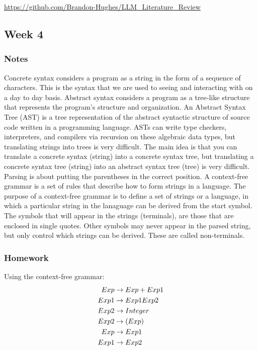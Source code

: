 \documentclass{article}
\theoremstyle{theorem}
\theoremstyle{definition}
\theoremstyle{remark}
\begin{document}
\url{https://github.com/Brandon-Hughes/LLM_Literature_Review}



\subsection{Week 4}

\subsubsection{Notes}

Concrete syntax considers a program as a string in the form of a sequence of characters. This is the syntax that we are used to seeing and interacting with on a day to day basis. 
Abstract syntax considers a program as a tree-like structure that represents the program's structure and organization. 
An Abstract Syntax Tree (AST) is a tree representation of the abstract syntactic structure of source code written in a programming language. 
ASTs can write type checkers, interpreters, and compilers via recursion on these algebraic data types, but translating strings into trees is very difficult.
The main idea is that you can translate a concrete syntax (string) into a concrete syntax tree, but translating a concrete syntax tree (string) into an abstract syntax tree (tree) is very difficult.
Parsing is about putting the parentheses in the correct position.
A context-free grammar is a set of rules that describe how to form strings in a language.
The purpose of a context-free grammar is to define a set of strings or a language, in which a particular string in the lanaguage can be derived from the start symbol. The symbols that will appear in the strings (terminals), are those that are enclosed in single quotes.
Other symbols may never appear in the parsed string, but only control which strings can be derived. These are called non-terminals.


\subsubsection{Homework}
Using the context-free grammar: 
\begin{align*}
Exp &\rightarrow Exp + Exp1 \\
Exp1 &\rightarrow Exp1 \* Exp2 \\
Exp2 &\rightarrow Integer \\
Exp2 &\rightarrow ( Exp )  \\
Exp &\rightarrow Exp1 \\
Exp1 &\rightarrow Exp2 \\    
\end{align*}
\end{document}
